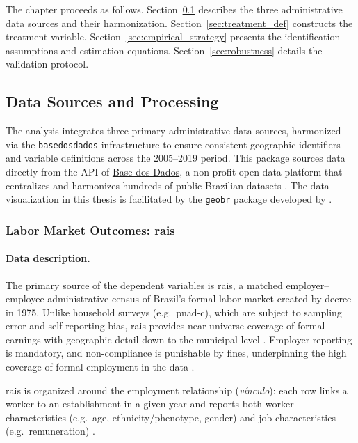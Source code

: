 The chapter proceeds as follows. Section~\ref{sec:data_processing} describes the three administrative data sources and their harmonization. Section~\ref{sec:treatment_def} constructs the treatment variable. Section~\ref{sec:empirical_strategy} presents the identification assumptions and estimation equations. Section~\ref{sec:robustness} details the validation protocol.


\subsection{Data Sources and Processing}
\label{sec:data_processing}

The analysis integrates three primary administrative data sources, harmonized via the \texttt{basedosdados} infrastructure \cite{R-basedosdados} to ensure consistent geographic identifiers and variable definitions across the 2005--2019 period. This package sources data directly from the API of \href{https://basedosdados.org/}{Base dos Dados}, a non-profit open data platform that centralizes and harmonizes hundreds of public Brazilian datasets \cite{basedosdados.org, Dahis2022}. The data visualization in this thesis is facilitated by the \texttt{geobr} package developed by .

\subsubsection{Labor Market Outcomes: \acrshort{rais}}

\paragraph{Data description.}
The primary source of the dependent variables is \acrfull{rais}, a matched employer--employee administrative census of Brazil's formal labor market created by decree in 1975. Unlike household surveys (e.g.\ \acrshort{pnad-c}), which are subject to sampling error and self-reporting bias, \acrshort{rais} provides near-universe coverage of formal earnings with geographic detail down to the municipal level \cite{rais-sumario, rais-ibge, DixCarneiro2018}. Employer reporting is mandatory, and non-compliance is punishable by fines, underpinning the high coverage of formal employment in the data \cite{EngbomEtAl2022}.

\acrshort{rais} is organized around the employment relationship (\emph{v\'inculo}): each row links a worker to an establishment in a given year and reports both worker characteristics (e.g.\ age, ethnicity/phenotype, gender) and job characteristics (e.g.\ remuneration) \cite{rais-sumario}.


